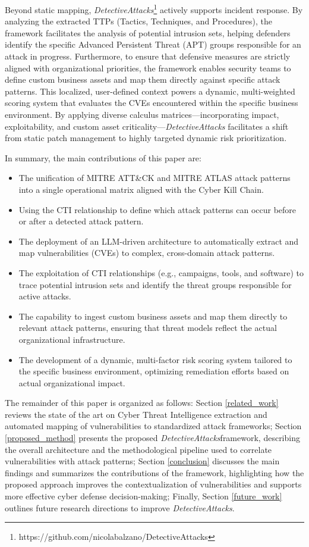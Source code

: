 \documentclass[conference]{IEEEtran}
\begin{document}
Beyond static mapping, \textit{DetectiveAttacks}\footnote{https://github.com/nicolabalzano/DetectiveAttacks} actively supports incident response. By analyzing the extracted TTPs (Tactics, Techniques, and Procedures), the framework facilitates the analysis of potential intrusion sets, helping defenders identify the specific Advanced Persistent Threat (APT) groups responsible for an attack in progress. Furthermore, to ensure that defensive measures are strictly aligned with organizational priorities, the framework enables security teams to define custom business assets and map them directly against specific attack patterns. This localized, user-defined context powers a dynamic, multi-weighted scoring system that evaluates the CVEs encountered within the specific business environment. By applying diverse calculus matrices—incorporating impact, exploitability, and custom asset criticality—\textit{DetectiveAttacks} facilitates a shift from static patch management to highly targeted dynamic risk prioritization.

In summary, the main contributions of this paper are:
\begin{itemize}
    \item The unification of MITRE ATT\&CK and MITRE ATLAS attack patterns into a single operational matrix aligned with the Cyber Kill Chain.
    \item Using the CTI relationship to define which attack patterns can occur before or after a detected attack pattern.
    \item The deployment of an LLM-driven architecture to automatically extract and map vulnerabilities (CVEs) to complex, cross-domain attack patterns.
    \item The exploitation of CTI relationships (e.g., campaigns, tools, and software) to trace potential intrusion sets and identify the threat groups responsible for active attacks.
    \item The capability to ingest custom business assets and map them directly to relevant attack patterns, ensuring that threat models reflect the actual organizational infrastructure.
    \item The development of a dynamic, multi-factor risk scoring system tailored to the specific business environment, optimizing remediation efforts based on actual organizational impact.
\end{itemize}

The remainder of this paper is organized as follows: Section \ref{related_work} reviews the state of the art on Cyber Threat Intelligence extraction and automated mapping of vulnerabilities to standardized attack frameworks; Section \ref{proposed_method} presents the proposed \textit{DetectiveAttacks}framework, describing the overall architecture and the methodological pipeline used to correlate vulnerabilities with attack patterns; Section \ref{conclusion} discusses the main findings and summarizes the contributions of the framework, highlighting how the proposed approach improves the contextualization of vulnerabilities and supports more effective cyber defense decision-making; Finally, Section \ref{future_work} outlines future research directions to improve \textit{DetectiveAttacks}.
\end{document}
